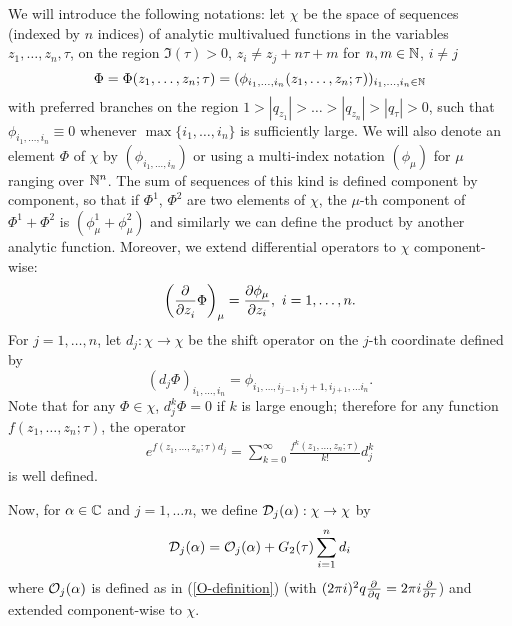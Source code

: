 \documentclass[12pt]{article}
\begin{document}
We will introduce the following notations: let $\chi$ be the space of sequences
(indexed by $n$ indices)
of analytic multivalued functions in the variables $z_1,\ldots, z_n, \tau$,
on the region $\Im(\tau) > 0$, $z_i\neq z_j + n\tau + m$ for
$n,m\in \mathbb{N}$, $i\neq j$
\begin{equation*}
  \Phi = \Phi(z_1,\ldots, z_n; \tau)
    = (\phi_{i_1,\ldots, i_n}(z_1,\ldots , z_n; \tau))_{i_1,\ldots, i_n \in \mathbb{N}}
\end{equation*}
with preferred branches on the region 
$1 > |q_{z_1}| > \ldots > |q_{z_n}| > |q_\tau| > 0$,
such that $\phi_{i_1,\ldots, i_n} \equiv 0$ whenever $\max\{i_1,\ldots, i_n\}$ is
sufficiently large. We will also denote an element $\Phi$ of $\chi$ by
$(\phi_{i_1,\ldots, i_n})$ or using a multi-index notation $(\phi_\mu)$ for
$\mu$ ranging over $\mathbb{N}^n$.
The sum of sequences of this kind is defined component by component, so
that if $\Phi^1$, $\Phi^2$ are two elements of $\chi$, the $\mu$-th component
of $\Phi^1 + \Phi^2$ is
  $(\phi^1_{\mu} + \phi^2_{\mu})$
and similarly we can define the product by another analytic function. Moreover, we
extend differential operators to $\chi$ component-wise:
\begin{equation*}
  \left(\frac{\partial^{}}{\partial z_i^{}} \Phi\right)_\mu = \frac{\partial \phi_{\mu}}
  {\partial z_i},\ i=1,\ldots, n.
\end{equation*}
For $j=1,\ldots,n$, let $d_j: \chi \rightarrow \chi$ be the shift operator on
the $j$-th coordinate defined by
\begin{equation*}
  (d_j \Phi)_{i_1,\ldots, i_n} = \phi_{i_1,\ldots, i_{j-1}, i_j+1, i_{j+1},
    \ldots i_n}.
\end{equation*}
Note that for any $\Phi\in \chi$, $d_j^k \Phi = 0$ if $k$ is large enough; therefore
for any function $f(z_1,\ldots, z_n; \tau)$, the operator
\begin{align*}
  e^{f(z_1,\ldots, z_n; \tau) d_j} = 
    \sum_{k=0}^\infty \frac{f^k(z_1,\ldots, z_n; \tau)}{k!}d_j^k
\end{align*}
is well defined.

Now, for $\alpha \in \mathbb{C}$ and $j= 1,\ldots n$, we define
$\mathcal{D}_j(\alpha) : \chi \rightarrow \chi$ by
\begin{align*}
  \mathcal{D}_j(\alpha) = \mathcal{O}_j(\alpha) + G_2(\tau)\sum_{i=1}^n d_i
\end{align*}
where $\mathcal{O}_j(\alpha)$ is defined as in (\ref{O-definition}) 
(with $(2\pi i)^2q\frac{\partial^{}}{\partial q^{}} = 2\pi i\frac{\partial^{}}{\partial \tau^{}}$) and extended component-wise
to $\chi$.
\end{document}
